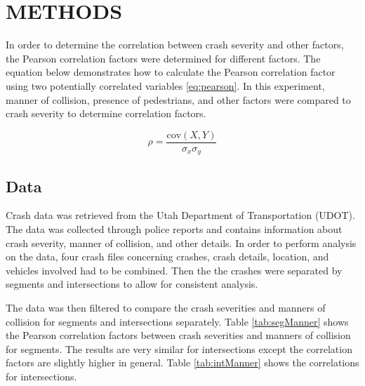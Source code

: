 \documentclass[3p, authoryear]{elsarticle} %
\begin{document}
\hypertarget{methods}{%
\section{METHODS}\label{methods}}

In order to determine the correlation between crash severity and other factors,
the Pearson correlation factors were determined for different factors. The
equation below demonstrates how to calculate the Pearson correlation factor
using two potentially correlated variables \eqref{eq:pearson}. In this experiment,
manner of collision, presence of pedestrians, and other factors were compared to
crash severity to determine correlation factors.

\begin{equation}
  \rho = \frac{\text{cov}(X,Y)}{\sigma_x \sigma_y}
  \label{eq:pearson}
\end{equation}

\hypertarget{data}{%
\subsection{Data}\label{data}}

Crash data was retrieved from the Utah Department of Transportation (UDOT). The data was collected through police reports and contains information about crash severity, manner of collision, and other details. In order to perform analysis on the data, four crash files concerning crashes, crash details, location, and vehicles involved had to be combined. Then the the crashes were separated by segments and intersections to allow for consistent analysis.

The data was then filtered to compare the crash severities and manners of collision for segments and intersections separately.
Table \ref{tab:segManner} shows the Pearson correlation factors between crash severities and manners of collision for segments. The results are very similar for intersections except the correlation factors are slightly higher in general. Table \ref{tab:intManner} shows the correlations for intersections.
\end{document}
